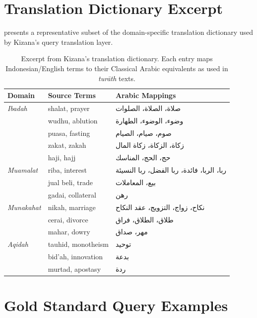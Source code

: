 \documentclass[preprint,12pt,authoryear]{elsarticle}
\begin{document}
\appendix

\section{Translation Dictionary Excerpt}
\label{appendix:dictionary}

 presents a representative subset of the domain-specific translation dictionary used by Kizana's query translation layer.

\begin{table}[t]
\centering
\caption{Excerpt from Kizana's translation dictionary. Each entry maps Indonesian/English terms to their Classical Arabic equivalents as used in \textit{tur\={a}th} texts.}
\label{tab:dict-excerpt}
\small
\begin{tabular}{llp{5cm}}
\toprule
Domain & Source Terms & Arabic Mappings \\
\midrule
\textit{Ibadah} & shalat, prayer & صلاة، الصلاة، الصلوات \\
& wudhu, ablution & وضوء، الوضوء، الطهارة \\
& puasa, fasting & صوم، صيام، الصيام \\
& zakat, zakah & زكاة، الزكاة، زكاة المال \\
& haji, hajj & حج، الحج، المناسك \\
\midrule
\textit{Muamalat} & riba, interest & ربا، الربا، فائدة، ربا الفضل، ربا النسيئة \\
& jual beli, trade & بيع، المعاملات \\
& gadai, collateral & رهن \\
\midrule
\textit{Munakahat} & nikah, marriage & نكاح، زواج، التزويج، عقد النكاح \\
& cerai, divorce & طلاق، الطلاق، فراق \\
& mahar, dowry & مهر، صداق \\
\midrule
\textit{Aqidah} & tauhid, monotheism & توحيد \\
& bid'ah, innovation & بدعة \\
& murtad, apostasy & ردة \\
\bottomrule
\end{tabular}
\end{table}

\section{Gold Standard Query Examples}
\label{appendix:queries}
\end{document}
